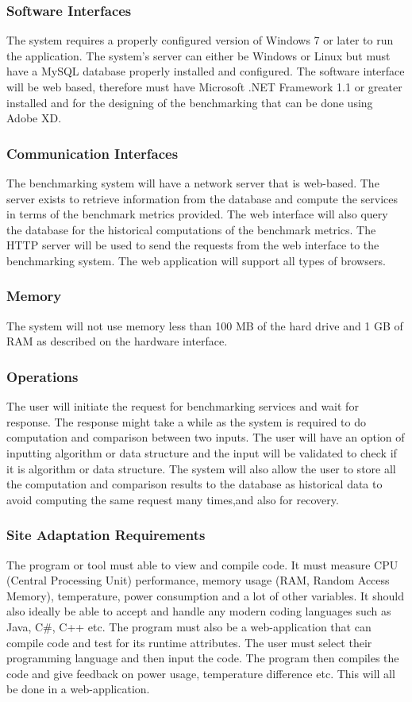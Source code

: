 \documentclass[a4paper,12pt]{article}
\begin{document}
\subsubsection{Software Interfaces}
The system requires a properly configured version of Windows 7 or later to run the application. The system's server can either be Windows or Linux but must have a MySQL database properly installed and configured. The software interface will be web based, therefore must have Microsoft .NET Framework 1.1 or greater installed and for the designing of the benchmarking that can be done using Adobe XD.

\subsubsection{Communication Interfaces}
The benchmarking system will have a network server that is web-based. The server exists to retrieve information from the database
and compute the services in terms of the benchmark metrics provided. The web interface will also query the database for the historical computations of the benchmark metrics. The HTTP server will be used to send the requests from the web interface to
the benchmarking system. The web application will support all types of browsers.
\subsubsection{Memory}
The system will not use memory less than 100 MB of the hard drive and 1 GB of RAM as described on the hardware interface.
\subsubsection{Operations}
The user will initiate the request for benchmarking services and wait for response. The response might take a while as the system is required to do computation and comparison between two inputs. The user will have an option of inputting algorithm or data structure and the input will be validated to check if it is algorithm or data structure. The system will also allow the user to store all the computation and comparison results to the database as historical data to avoid computing the same request many times,and also for recovery. 
\subsubsection{Site Adaptation Requirements}
The program or tool must able to view and compile code. It must measure CPU (Central Processing Unit) performance, memory usage (RAM, Random Access Memory), temperature, power consumption and a lot of other variables.
It should also ideally be able to accept and handle any modern coding languages such as Java, C\#, C++ etc. The program must also be a web-application that can compile code and test for its runtime attributes. 
The user must select their programming language and then input the code. The program then compiles the code and give feedback on power usage, temperature difference etc. This will all be done in a web-application.
\end{document}
